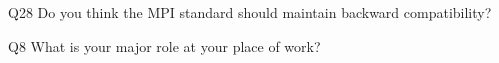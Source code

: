 \begin{description}%
\item{Q28} Do you think the MPI standard should maintain backward compatibility?%
\item{Q8} What is your major role at your place of work?%
\end{description}%
